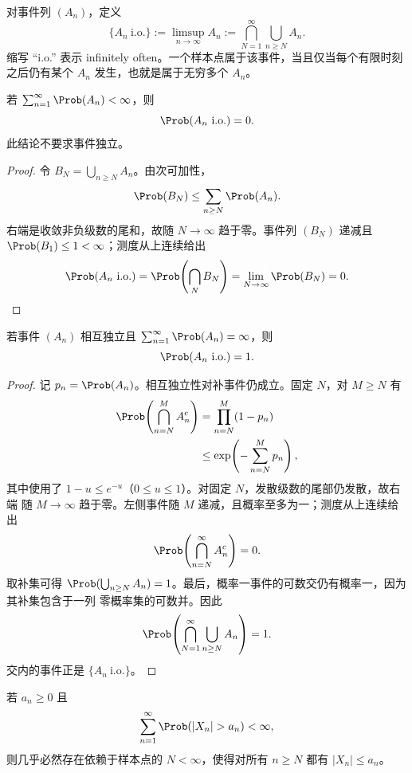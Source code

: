 \begin{definition}[limsup 事件]\label{def:5-1-3-1}
对事件列 $(A_n)$，定义
\[
 \{A_n\ \mathrm{i.o.}\}
 :=\limsup_{n\to\infty}A_n
 :=\bigcap_{N=1}^\infty\bigcup_{n\ge N}A_n.
\]
缩写 ``i.o.'' 表示 infinitely often。一个样本点属于该事件，当且仅当每个有限时刻之后仍有某个
$A_n$ 发生，也就是属于无穷多个 $A_n$。
\end{definition}

\begin{theorem}\label{theorem:5-1-3-1}
若 $\sum_{n=1}^\infty\Prob(A_n)<\infty$，则
\[
 \Prob(A_n\ \mathrm{i.o.})=0.
\]
此结论不要求事件独立。
\end{theorem}

\begin{proof}
令 $B_N=\bigcup_{n\ge N}A_n$。由次可加性，
\[
 \Prob(B_N)\le\sum_{n\ge N}\Prob(A_n).
\]
右端是收敛非负级数的尾和，故随 $N\to\infty$ 趋于零。事件列 $(B_N)$ 递减且
$\Prob(B_1)\le1<\infty$；测度从上连续给出
\[
 \Prob(A_n\ \mathrm{i.o.})
 =\Prob\!\left(\bigcap_NB_N\right)
 =\lim_{N\to\infty}\Prob(B_N)=0.
\]
\end{proof}

\begin{theorem}\label{theorem:5-1-3-2}
若事件 $(A_n)$ 相互独立且
$\sum_{n=1}^\infty\Prob(A_n)=\infty$，则
\[
 \Prob(A_n\ \mathrm{i.o.})=1.
\]
\end{theorem}

\begin{proof}
记 $p_n=\Prob(A_n)$。相互独立性对补事件仍成立。固定 $N$，对 $M\ge N$ 有
\begin{align*}
 \Prob\!\left(\bigcap_{n=N}^M A_n^c\right)
 &=\prod_{n=N}^M(1-p_n)\\
 &\le\exp\!\left(-\sum_{n=N}^Mp_n\right),
\end{align*}
其中使用了 $1-u\le e^{-u}$（$0\le u\le1$）。对固定 $N$，发散级数的尾部仍发散，故右端
随 $M\to\infty$ 趋于零。左侧事件随 $M$ 递减，且概率至多为一；测度从上连续给出
\[
 \Prob\!\left(\bigcap_{n=N}^\infty A_n^c\right)=0.
\]
取补集可得
$\Prob(\bigcup_{n\ge N}A_n)=1$。最后，概率一事件的可数交仍有概率一，因为其补集包含于一列
零概率集的可数并。因此
\[
 \Prob\!\left(\bigcap_{N=1}^\infty\bigcup_{n\ge N}A_n\right)=1.
\]
交内的事件正是 $\{A_n\ \mathrm{i.o.}\}$。
\end{proof}

\begin{proposition}[可和概率推出 a.s. 控制]\label{proposition:5-1-3-4}
若 $a_n\ge0$ 且
\[
 \sum_{n=1}^\infty\Prob(|X_n|>a_n)<\infty,
\]
则几乎必然存在依赖于样本点的 $N<\infty$，使得对所有 $n\ge N$ 都有
$|X_n|\le a_n$。
\end{proposition}

